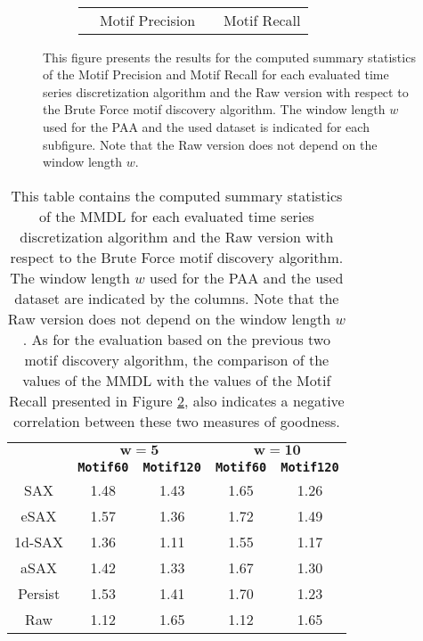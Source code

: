 \begin{figure}[H]
\begin{subfigure}[t]{0.45\textwidth}
\label{fig:bf_120_10}
\end{subfigure}
\\[10pt]
\begin{subfigure}[t]{0.5\textwidth}
\centering
\begin{tabular}{cccc}
\cellcolor[HTML]{4682B4} & Motif Precision & \cellcolor[HTML]{FFA500} & Motif Recall \\
\end{tabular}
\end{subfigure}
\caption[Evaluation - Motif Precision \& Motif Recall for the Brute Force]{This figure presents the results for the computed summary statistics of the Motif Precision and Motif Recall for each evaluated time series discretization algorithm and the Raw version with respect to the Brute Force motif discovery algorithm. The window length $w$ used for the \ac{PAA} and the used dataset is indicated for each subfigure. Note that the Raw version does not depend on the window length $w$.}
\label{fig:results_brute_force}
\end{figure}
\begin{table}[htb]
\centering
\begin{tabular}{ccccc} 
\toprule
& \multicolumn{2}{c}{$\mathbf{w = 5}$} & \multicolumn{2}{c}{$\mathbf{w = 10}$} \\
\cmidrule(lr){2-3} \cmidrule(lr){4-5}
 & \texttt{\textbf{Motif60}} & \texttt{\textbf{Motif120}} & \texttt{\textbf{Motif60}} & \texttt{\textbf{Motif120}} \\
\midrule
\ac{SAX} & 1.48 & 1.43 & 1.65 & 1.26 \\
\ac{eSAX} & 1.57 & 1.36 & 1.72 & 1.49 \\
\ac{1d-SAX} & 1.36 & 1.11 & 1.55 & 1.17 \\
\ac{aSAX} & 1.42 & 1.33 & 1.67 & 1.30 \\
Persist & 1.53 & 1.41 & 1.70 & 1.23 \\
Raw & 1.12 & 1.65 & 1.12 & 1.65 \\
\bottomrule
\end{tabular}
\vspace*{0.5cm}
\caption[Evaluation - MMDL for the Brute Force]{This table contains the computed summary statistics of the \ac{MMDL} for each evaluated time series discretization algorithm and the Raw version with respect to the Brute Force motif discovery algorithm. The window length $w$ used for the \ac{PAA} and the used dataset are indicated by the columns. Note that the Raw version does not depend on the window length $w$. As for the evaluation based on the previous two motif discovery algorithm, the comparison of the values of the \ac{MMDL} with the values of the Motif Recall presented in Figure \ref{fig:results_brute_force}, also indicates a negative correlation between these two measures of goodness.}
\label{tab:mmdl_brute_force}
\end{table}